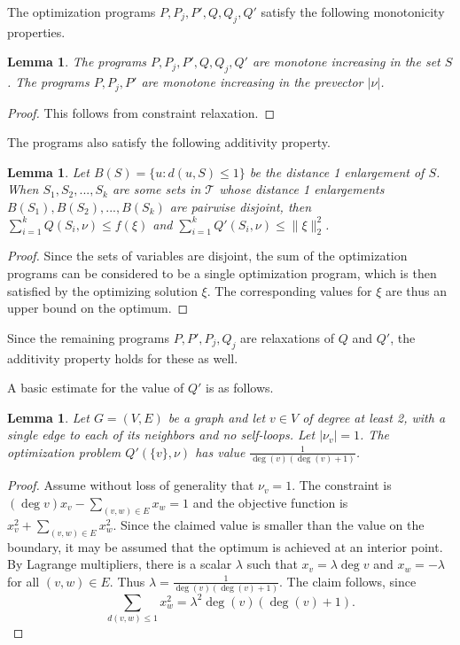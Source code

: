 \documentclass[a4paper, 12pt, notitlepage]{amsart}
\newcommand{\sT}{\mathscr{T}}
\newtheorem{lemma}[theorem]{Lemma}
\theoremstyle{remark}
\begin{document}
The optimization programs $P, P_j, P', Q, Q_j, Q'$ satisfy the following monotonicity properties.
\begin{lemma}
 The programs $P, P_j, P', Q, Q_j, Q'$ are monotone increasing in the set $S$.  The programs $P, P_j, P'$ are monotone increasing in the prevector $|\nu|$.
\end{lemma}

\begin{proof}
 This follows from constraint relaxation.
\end{proof}

The programs also satisfy the following additivity property.
\begin{lemma}
 Let $B(S) = \{u: d(u, S) \leq 1\}$ be the distance 1 enlargement of $S$.  When $S_1, S_2, ..., S_k$ are some sets in $\sT$ whose distance 1 enlargements $B(S_1), B(S_2), ..., B(S_k)$ are pairwise disjoint, then $\sum_{i=1}^k Q(S_i, \nu) \leq f(\xi)$ and $\sum_{i=1}^k Q'(S_i, \nu) \leq \|\xi\|_2^2$.
\end{lemma}
\begin{proof}
 Since the sets of variables are disjoint, the sum of the optimization programs can be considered to be a single optimization program, which is then satisfied by the optimizing solution $\xi$.  The corresponding values for $\xi$ are thus an upper bound on the optimum.
\end{proof}
Since the remaining programs $P, P', P_j, Q_j$ are relaxations of $Q$ and $Q'$, the additivity property holds for these as well.

A basic estimate for the value of $Q'$ is as follows.

\begin{lemma}\label{2_norm_opt_lemma}
 Let $G = (V,E)$ be a graph and let $v \in V$ of degree at least 2, with a single edge to each of its neighbors and no self-loops. Let $|\nu_v| = 1$.   The optimization problem $Q'(\{v\}, \nu)$ 
has value $\frac{1}{\deg(v)(\deg(v) + 1)}$.
\end{lemma}
\begin{proof}
Assume without loss of generality that $\nu_v = 1$. The constraint is $(\deg v) x_v - \sum_{(v,w) \in E} x_w = 1$ and the objective function is $x_v^2 + \sum_{(v,w) \in E} x_w^2$. Since the claimed value is smaller than the value on the boundary, it may be assumed that the optimum is achieved at an interior point.
By Lagrange multipliers, there is a scalar $\lambda$ such that  $x_v = \lambda \deg v$ and $x_w = -\lambda$ for all $(v,w) \in E$.  Thus $\lambda = \frac{1}{\deg(v)(\deg(v) +1)}$.  The claim follows, since \begin{equation}\sum_{d(v,w) \leq 1} x_w^2 = \lambda^2 \deg(v)(\deg(v)+1).\end{equation}
\end{proof}
\end{document}
